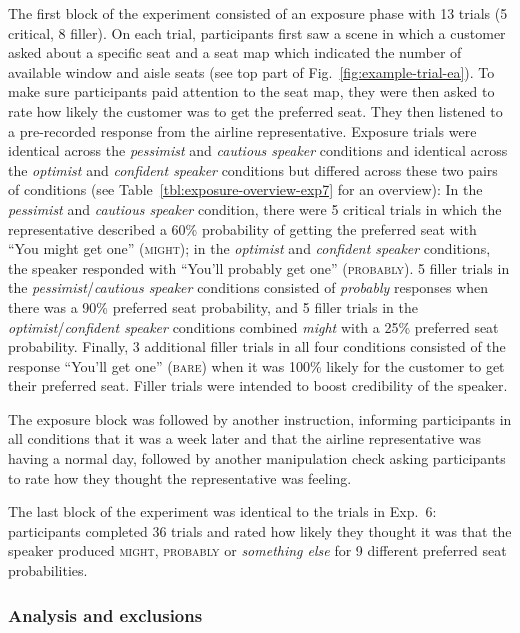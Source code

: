 The first block of the experiment consisted of an exposure phase with 13 trials (5 critical, 8 filler). On each trial, participants first saw a scene in which a customer asked about a specific seat and a seat map which indicated the number of available window and aisle seats (see top part of Fig.~\ref{fig:example-trial-ea}). To make sure participants paid attention to the seat map, they were then asked to rate how likely the customer  was to get the preferred seat. They then listened to a pre-recorded response from the airline representative. Exposure trials were identical across the \textit{pessimist} and \textit{cautious speaker} conditions and identical across the \textit{optimist} and \textit{confident speaker} conditions but differed across these two pairs of conditions (see Table~\ref{tbl:exposure-overview-exp7} for an overview): In the \textit{pessimist} and \textit{cautious speaker} condition, there were 5 critical trials in which the representative described a 60\% probability of getting the preferred seat with ``You might get one'' (\textsc{might}); in the \textit{optimist} and \textit{confident speaker} conditions, the speaker responded with ``You'll probably get one'' (\textsc{probably}). 5 filler trials in the \textit{pessimist}/\textit{cautious speaker} conditions consisted of \textit{probably} responses   when there was a 90\% preferred seat probability, and 5 filler trials in the \textit{optimist}/\textit{confident speaker} conditions combined \textit{might} with a 25\% preferred seat  probability. Finally, 3 additional filler trials in all four conditions consisted of the response ``You'll get one'' (\textsc{bare}) when it was 100\% likely for the customer to get their preferred seat. Filler trials were intended to boost credibility of the speaker.

The exposure block was followed by another instruction, informing participants in all conditions that it was a week later and that the airline representative was having a normal day, followed by another manipulation check asking participants to rate how they thought the representative was feeling. 

The last block of the experiment was identical to the trials in Exp.~6: participants completed 36 trials and rated how likely they thought it was that the speaker produced \textsc{might}, \textsc{probably} or \textit{something else} for 9 different preferred seat probabilities.

\subsubsection{Analysis and exclusions}

